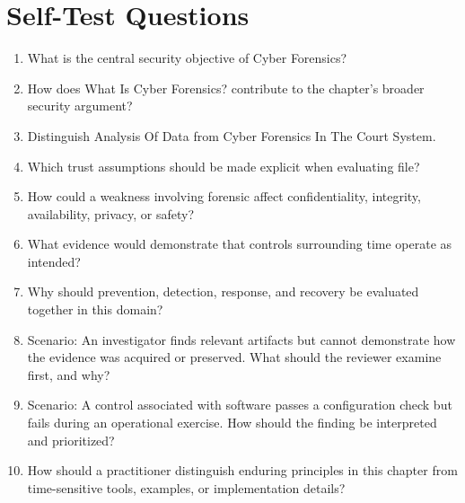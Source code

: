 \documentclass[11pt]{article}
\begin{document}
\section*{Self-Test Questions}
\begin{enumerate}
\item What is the central security objective of Cyber Forensics?
\item How does What Is Cyber Forensics? contribute to the chapter's broader security argument?
\item Distinguish Analysis Of Data from Cyber Forensics In The Court System.
\item Which trust assumptions should be made explicit when evaluating file?
\item How could a weakness involving forensic affect confidentiality, integrity, availability, privacy, or safety?
\item What evidence would demonstrate that controls surrounding time operate as intended?
\item Why should prevention, detection, response, and recovery be evaluated together in this domain?
\item Scenario: An investigator finds relevant artifacts but cannot demonstrate how the evidence was acquired or preserved. What should the reviewer examine first, and why?
\item Scenario: A control associated with software passes a configuration check but fails during an operational exercise. How should the finding be interpreted and prioritized?
\item How should a practitioner distinguish enduring principles in this chapter from time-sensitive tools, examples, or implementation details?
\end{enumerate}
\end{document}
